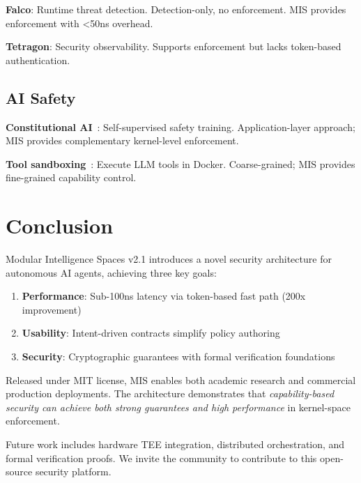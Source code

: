 \documentclass[11pt,a4paper]{article}
\begin{document}
\textbf{Falco}: Runtime threat detection. Detection-only, no enforcement. MIS provides enforcement with <50ns overhead.

\textbf{Tetragon}: Security observability. Supports enforcement but lacks token-based authentication.

\subsection{AI Safety}

\textbf{Constitutional AI}~\cite{Bai2022}: Self-supervised safety training. Application-layer approach; MIS provides complementary kernel-level enforcement.

\textbf{Tool sandboxing}~\cite{Schick2023}: Execute LLM tools in Docker. Coarse-grained; MIS provides fine-grained capability control.

\section{Conclusion}
\label{sec:conclusion}

Modular Intelligence Spaces v2.1 introduces a novel security architecture for autonomous AI agents, achieving three key goals:

\begin{enumerate}
    \item \textbf{Performance}: Sub-100ns latency via token-based fast path (200x improvement)
    \item \textbf{Usability}: Intent-driven contracts simplify policy authoring
    \item \textbf{Security}: Cryptographic guarantees with formal verification foundations
\end{enumerate}

Released under MIT license, MIS enables both academic research and commercial production deployments. The architecture demonstrates that \textit{capability-based security can achieve both strong guarantees and high performance} in kernel-space enforcement.

Future work includes hardware TEE integration, distributed orchestration, and formal verification proofs. We invite the community to contribute to this open-source security platform.

\end{document}
